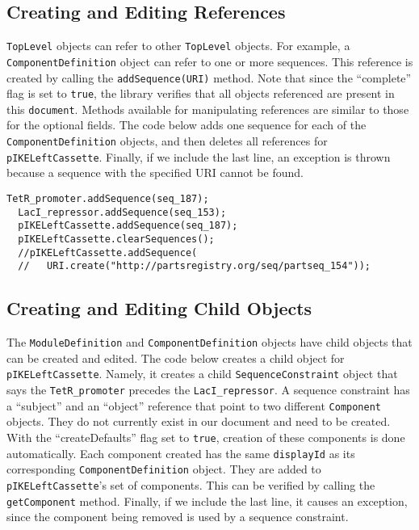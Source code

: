 \subsection*{Creating and Editing References}

\lstinline+TopLevel+ objects can refer to other \lstinline+TopLevel+ objects.  For example, 
a \lstinline+ComponentDefinition+ object can refer to one or more sequences.  This reference is created by calling the \lstinline+addSequence(URI)+ method. Note that since the ``complete'' flag is set to \lstinline+true+, the library verifies that all objects referenced are present in this \lstinline+document+. Methods available for manipulating references are similar
to those for the optional fields. The code below adds one sequence for
each of the \lstinline+ComponentDefinition+ objects, and then deletes all references for \lstinline+pIKELeftCassette+.  Finally, if we include the last line, an exception is thrown because a sequence with the specified URI cannot be found.

\begin{minipage}{0.95\textwidth} 
\begin{lstlisting}[basicstyle=\footnotesize\ttfamily]
  TetR_promoter.addSequence(seq_187);		
  LacI_repressor.addSequence(seq_153);		
  pIKELeftCassette.addSequence(seq_187);
  pIKELeftCassette.clearSequences();
  //pIKELeftCassette.addSequence(
  //   URI.create("http://partsregistry.org/seq/partseq_154"));
\end{lstlisting}
\end{minipage}

\subsection*{Creating and Editing Child Objects}

The \lstinline+ModuleDefinition+ and \lstinline+ComponentDefinition+ objects have child objects that can be created and edited.  The code below creates a child object for \lstinline+pIKELeftCassette+.
Namely, it creates a child \lstinline+SequenceConstraint+ object that says the \lstinline+TetR_promoter+ precedes the \lstinline+LacI_repressor+.  A sequence constraint has a
``subject'' and an ``object'' reference that point to two different \lstinline+Component+ objects. They do not currently exist in our document and need to be created. With the ``createDefaults'' flag
set to \lstinline+true+, creation of these components is done automatically.  Each component created has the same \lstinline+displayId+ as its corresponding \lstinline+ComponentDefinition+
object.  They are added to \lstinline+pIKELeftCassette+'s set of components. 
This can be verified by calling the \lstinline+getComponent+ method.  Finally, if we include the last line, it causes an exception, since the component being removed is used by a sequence constraint. 

